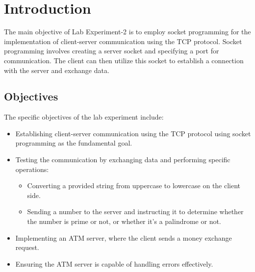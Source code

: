 \documentclass[11pt]{article}
\begin{document}
\section{Introduction}
The main objective of Lab Experiment-2 is to employ socket programming for the implementation of client-server communication using the TCP protocol. Socket programming involves creating a server socket and specifying a port for communication. The client can then utilize this socket to establish a connection with the server and exchange data.

\subsection{Objectives}
The specific objectives of the lab experiment include:
\begin{itemize}
    \item Establishing client-server communication using the TCP protocol using socket programming as the fundamental goal.
    \item Testing the communication by exchanging data and performing specific operations:
    \begin{itemize}
        \item Converting a provided string from uppercase to lowercase on the client side.
        \item Sending a number to the server and instructing it to determine whether the number is prime or not, or whether it's a palindrome or not.
    \end{itemize}
    \item Implementing an ATM server, where the client sends a money exchange request.
    \item Ensuring the ATM server is capable of handling errors effectively.
\end{itemize}
\end{document}
